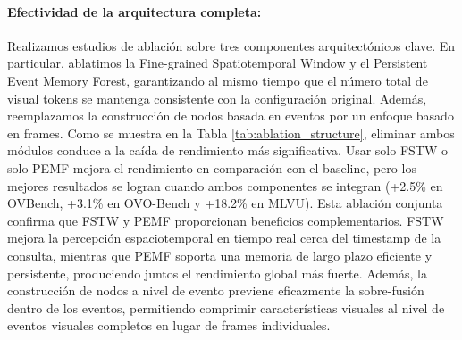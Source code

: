 \paragraph{Efectividad de la arquitectura completa:}
Realizamos estudios de ablación sobre tres componentes arquitectónicos clave. En particular, ablatimos la Fine-grained Spatiotemporal Window y el Persistent Event Memory Forest, garantizando al mismo tiempo que el número total de visual tokens se mantenga consistente con la configuración original. Además, reemplazamos la construcción de nodos basada en eventos por un enfoque basado en frames. Como se muestra en la Tabla \ref{tab:ablation_structure}, eliminar ambos módulos conduce a la caída de rendimiento más significativa. Usar solo FSTW o solo PEMF mejora el rendimiento en comparación con el baseline, pero los mejores resultados se logran cuando ambos componentes se integran (+2.5\% en OVBench, +3.1\% en OVO-Bench y +18.2\% en MLVU). Esta ablación conjunta confirma que FSTW y PEMF proporcionan beneficios complementarios. FSTW mejora la percepción espaciotemporal en tiempo real cerca del timestamp de la consulta, mientras que PEMF soporta una memoria de largo plazo eficiente y persistente, produciendo juntos el rendimiento global más fuerte. Además, la construcción de nodos a nivel de evento previene eficazmente la sobre-fusión dentro de los eventos, permitiendo comprimir características visuales al nivel de eventos visuales completos en lugar de frames individuales.





